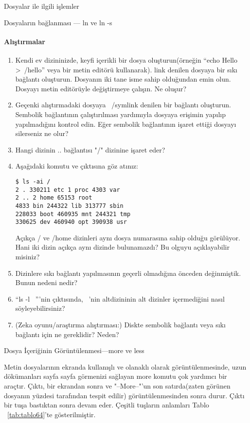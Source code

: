\begin{section}{Dosyalar ile ilgili işlemler}
\begin{subsection}{Dosyaların bağlanması — ln ve ln -s}
\paragraph{{\Huge{\PencilLeftDown}}Alıştırmalar}{
\begin{enumerate}
 \item Kendi ev dizininizde, keyfi içerikli bir dosya oluşturun(örneğin “echo Hello >~/hello” veya bir metin editörü kullanarak). link denilen dosyaya bir sıkı bağlantı oluşturun. Dosyanın iki tane isme sahip olduğundan emin olun. Dosyayı metin editörüyle değiştirmeye çalışın. Ne oluşur?
 \item Geçenki alıştırmadaki dosyaya ~/symlink denilen bir bağlantı oluşturun. Sembolik bağlantının çalıştırılması yardımıyla dosyaya erişimin yapılıp yapılmadığını kontrol edin. Eğer sembolik bağlantının işaret ettiği dosyayı silerseniz ne olur?
 \item Hangi dizinin .. bağlantısı "/" dizinine işaret eder?
 \item Aşağıdaki komutu ve çıktısına göz atınız:\begin{verbatim}
$ ls -ai /
2 . 330211 etc 1 proc 4303 var
2 .. 2 home 65153 root
4833 bin 244322 lib 313777 sbin
228033 boot 460935 mnt 244321 tmp
330625 dev 460940 opt 390938 usr 
 \end{verbatim} Açıkça / ve /home dizinleri aynı dosya numarasına sahip olduğu görülüyor. Hani iki dizin açıkça aynı dizinde bulunamazdı? Bu olguyu açıklayabilir misiniz?
 \item Dizinlere sıkı bağlantı yapılmasının geçerli olmadığına önceden değinmiştik. Bunun nedeni nedir?
 \item “ls -l ~”'nin çıktısında, ~'nin altdizininin alt dizinler içermediğini nasıl söyleyebilirsiniz?
 \item (Zeka oyunu/araştırma alıştırması:) Diskte sembolik bağlantı veya sıkı bağlantı için ne gereklidir? Neden?
\end{enumerate}}
\end{subsection}
\begin{subsection}{Dosya İçeriğinin Görüntülenmesi—more ve less}

Metin dosyalarının ekranda kullanışlı ve olanaklı olarak görüntülenmesinde, uzun dökümanları sayfa sayfa görmenizi sağlayan more komutu çok yardımcı bir araçtır. Çıktı, bir ekrandan sonra ve "--More--"'un son satırda(zaten görünen dosyanın yüzdesi tarafından tespit edilir) görüntülenmesinden sonra durur. Çıktı bir tuşa bastıktan sonra devam eder. Çeşitli tuşların anlamları Tablo ~\ref{tab:tablo64}'te gösterilmiştir.


\end{subsection}
\end{section}
